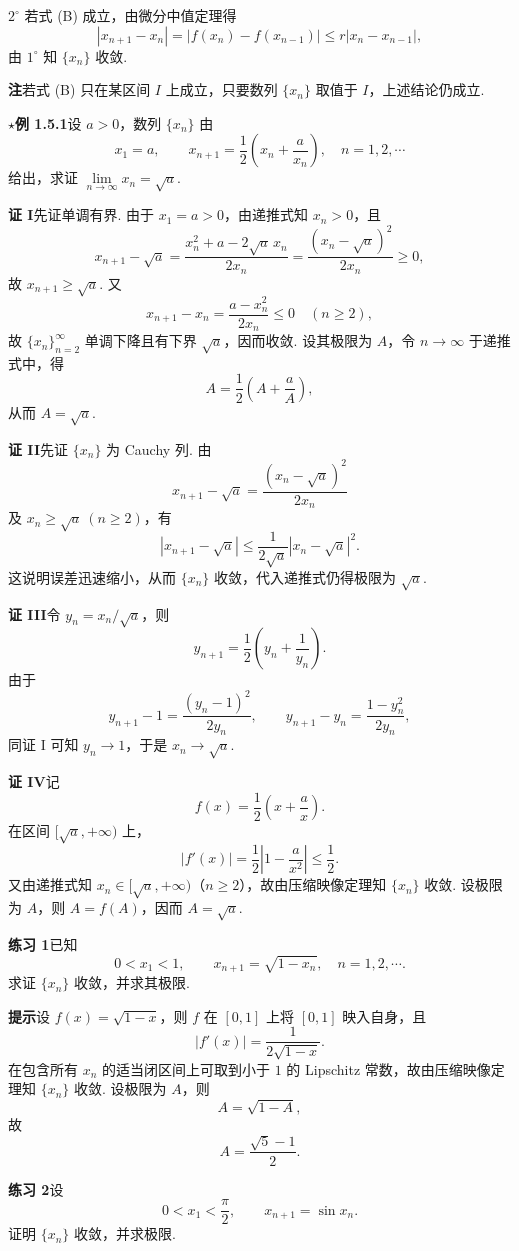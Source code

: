 \documentclass[UTF8,12pt,a4paper,fontset=fandol]{ctexart}
\begin{document}
$2^\circ$ 若式 (B) 成立，由微分中值定理得
\[
  |x_{n+1}-x_n|=|f(x_n)-f(x_{n-1})|
  \le r|x_n-x_{n-1}|,
\]
由 $1^\circ$ 知 $\{x_n\}$ 收敛.

\noindent\textbf{注}\quad 若式 (B) 只在某区间 $I$ 上成立，只要数列 $\{x_n\}$ 取值于 $I$，上述结论仍成立.

\noindent\textbf{$\star$例 1.5.1}\quad 设 $a>0$，数列 $\{x_n\}$ 由
\[
  x_1=a,\qquad x_{n+1}=\frac{1}{2}\left(x_n+\frac{a}{x_n}\right),\quad n=1,2,\cdots
\]
给出，求证 $\lim\limits_{n\to\infty}x_n=\sqrt a$.

\noindent\textbf{证 I}\quad 先证单调有界. 由于 $x_1=a>0$，由递推式知 $x_n>0$，且
\[
  x_{n+1}-\sqrt a
  =\frac{x_n^2+a-2\sqrt a\,x_n}{2x_n}
  =\frac{(x_n-\sqrt a)^2}{2x_n}\ge 0,
\]
故 $x_{n+1}\ge \sqrt a$. 又
\[
  x_{n+1}-x_n
  =\frac{a-x_n^2}{2x_n}
  \le 0\quad (n\ge 2),
\]
故 $\{x_n\}_{n=2}^\infty$ 单调下降且有下界 $\sqrt a$，因而收敛. 设其极限为 $A$，令 $n\to\infty$ 于递推式中，得
\[
  A=\frac{1}{2}\left(A+\frac{a}{A}\right),
\]
从而 $A=\sqrt a$.

\noindent\textbf{证 II}\quad 先证 $\{x_n\}$ 为 Cauchy 列. 由
\[
  x_{n+1}-\sqrt a=\frac{(x_n-\sqrt a)^2}{2x_n}
\]
及 $x_n\ge \sqrt a\ (n\ge 2)$，有
\[
  |x_{n+1}-\sqrt a|\le \frac{1}{2\sqrt a}|x_n-\sqrt a|^2.
\]
这说明误差迅速缩小，从而 $\{x_n\}$ 收敛，代入递推式仍得极限为 $\sqrt a$.

\noindent\textbf{证 III}\quad 令 $y_n=x_n/\sqrt a$，则
\[
  y_{n+1}=\frac{1}{2}\left(y_n+\frac{1}{y_n}\right).
\]
由于
\[
  y_{n+1}-1=\frac{(y_n-1)^2}{2y_n},\qquad
  y_{n+1}-y_n=\frac{1-y_n^2}{2y_n},
\]
同证 I 可知 $y_n\to 1$，于是 $x_n\to \sqrt a$.

\noindent\textbf{证 IV}\quad 记
\[
  f(x)=\frac{1}{2}\left(x+\frac{a}{x}\right).
\]
在区间 $[\sqrt a,+\infty)$ 上，
\[
  |f'(x)|=\frac{1}{2}\left|1-\frac{a}{x^2}\right|\le \frac12.
\]
又由递推式知 $x_n\in[\sqrt a,+\infty)$（$n\ge2$），故由压缩映像定理知 $\{x_n\}$ 收敛. 设极限为 $A$，则 $A=f(A)$，因而 $A=\sqrt a$.

\noindent\textbf{练习 1}\quad 已知
\[
  0<x_1<1,\qquad x_{n+1}=\sqrt{1-x_n},\quad n=1,2,\cdots.
\]
求证 $\{x_n\}$ 收敛，并求其极限.

\noindent\textbf{提示}\quad 设 $f(x)=\sqrt{1-x}$，则 $f$ 在 $[0,1]$ 上将 $[0,1]$ 映入自身，且
\[
  |f'(x)|=\frac{1}{2\sqrt{1-x}}.
\]
在包含所有 $x_n$ 的适当闭区间上可取到小于 $1$ 的 Lipschitz 常数，故由压缩映像定理知 $\{x_n\}$ 收敛. 设极限为 $A$，则
\[
  A=\sqrt{1-A},
\]
故
\[
  A=\frac{\sqrt5-1}{2}.
\]

\noindent\textbf{练习 2}\quad 设
\[
  0<x_1<\frac{\pi}{2},\qquad x_{n+1}=\sin x_n.
\]
证明 $\{x_n\}$ 收敛，并求极限.
\end{document}
